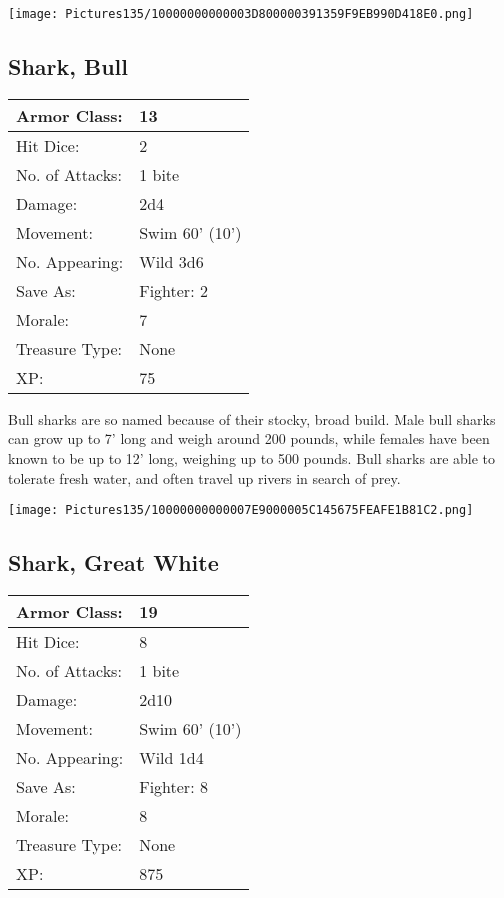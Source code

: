 \documentclass[a4paper,twoside,openany,10pt]{book}
\begin{document}
\begin{multicols}{2}
\begin{center} \texttt{[image: Pictures135/10000000000003D800000391359F9EB990D418E0.png]} \end{center}


\subsection*{Shark, Bull}\label{shark-bull}

\begin{tabularx}{0.50\textwidth}{@{}lX@{}}
Armor Class: & 13 \\\hline
Hit Dice: & 2 \\\hline
No. of Attacks: & 1 bite \\\hline
Damage: & 2d4 \\\hline
Movement: & Swim 60' (10') \\\hline
No. Appearing: & Wild 3d6 \\\hline
Save As: & Fighter: 2 \\\hline
Morale: & 7 \\\hline
Treasure Type: & None \\\hline
XP: & 75 \\\hline
\end{tabularx}\medskip

Bull sharks are so named because of their stocky, broad build. Male bull sharks can grow up to 7' long and weigh around 200 pounds, while females have been known to be up to 12' long, weighing up to 500 pounds. Bull sharks are able to tolerate fresh water, and often travel up rivers in search of prey.

\begin{center} \texttt{[image: Pictures135/10000000000007E9000005C145675FEAFE1B81C2.png]} \end{center}

\subsection*{Shark, Great White}\label{shark-great-white}

\begin{tabularx}{0.50\textwidth}{@{}lX@{}}
Armor Class: & 19 \\\hline
Hit Dice: & 8 \\\hline
No. of Attacks: & 1 bite \\\hline
Damage: & 2d10 \\\hline
Movement: & Swim 60' (10') \\\hline
No. Appearing: & Wild 1d4 \\\hline
Save As: & Fighter: 8 \\\hline
Morale: & 8 \\\hline
Treasure Type: & None \\\hline
XP: & 875 \\\hline
\end{tabularx}


\end{multicols}
\end{document}
